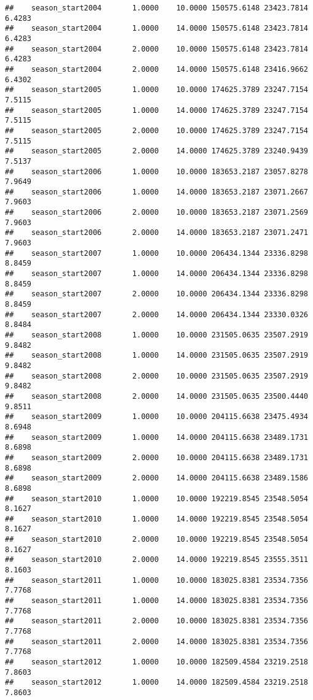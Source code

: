 \documentclass[
]{book}
\begin{document}
\begin{verbatim}
##    season_start2004       1.0000    10.0000 150575.6148 23423.7814  6.4283
##    season_start2004       1.0000    14.0000 150575.6148 23423.7814  6.4283
##    season_start2004       2.0000    10.0000 150575.6148 23423.7814  6.4283
##    season_start2004       2.0000    14.0000 150575.6148 23416.9662  6.4302
##    season_start2005       1.0000    10.0000 174625.3789 23247.7154  7.5115
##    season_start2005       1.0000    14.0000 174625.3789 23247.7154  7.5115
##    season_start2005       2.0000    10.0000 174625.3789 23247.7154  7.5115
##    season_start2005       2.0000    14.0000 174625.3789 23240.9439  7.5137
##    season_start2006       1.0000    10.0000 183653.2187 23057.8278  7.9649
##    season_start2006       1.0000    14.0000 183653.2187 23071.2667  7.9603
##    season_start2006       2.0000    10.0000 183653.2187 23071.2569  7.9603
##    season_start2006       2.0000    14.0000 183653.2187 23071.2471  7.9603
##    season_start2007       1.0000    10.0000 206434.1344 23336.8298  8.8459
##    season_start2007       1.0000    14.0000 206434.1344 23336.8298  8.8459
##    season_start2007       2.0000    10.0000 206434.1344 23336.8298  8.8459
##    season_start2007       2.0000    14.0000 206434.1344 23330.0326  8.8484
##    season_start2008       1.0000    10.0000 231505.0635 23507.2919  9.8482
##    season_start2008       1.0000    14.0000 231505.0635 23507.2919  9.8482
##    season_start2008       2.0000    10.0000 231505.0635 23507.2919  9.8482
##    season_start2008       2.0000    14.0000 231505.0635 23500.4440  9.8511
##    season_start2009       1.0000    10.0000 204115.6638 23475.4934  8.6948
##    season_start2009       1.0000    14.0000 204115.6638 23489.1731  8.6898
##    season_start2009       2.0000    10.0000 204115.6638 23489.1731  8.6898
##    season_start2009       2.0000    14.0000 204115.6638 23489.1586  8.6898
##    season_start2010       1.0000    10.0000 192219.8545 23548.5054  8.1627
##    season_start2010       1.0000    14.0000 192219.8545 23548.5054  8.1627
##    season_start2010       2.0000    10.0000 192219.8545 23548.5054  8.1627
##    season_start2010       2.0000    14.0000 192219.8545 23555.3511  8.1603
##    season_start2011       1.0000    10.0000 183025.8381 23534.7356  7.7768
##    season_start2011       1.0000    14.0000 183025.8381 23534.7356  7.7768
##    season_start2011       2.0000    10.0000 183025.8381 23534.7356  7.7768
##    season_start2011       2.0000    14.0000 183025.8381 23534.7356  7.7768
##    season_start2012       1.0000    10.0000 182509.4584 23219.2518  7.8603
##    season_start2012       1.0000    14.0000 182509.4584 23219.2518  7.8603

\end{verbatim}
\end{document}
